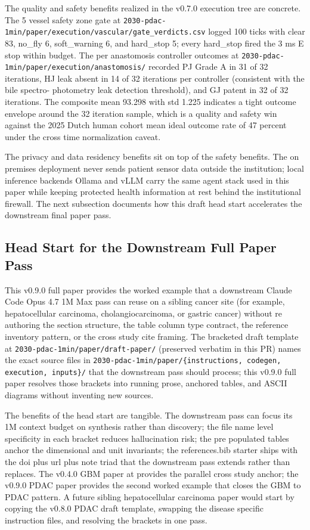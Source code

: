 The quality and safety benefits realized in the v0.7.0 execution
tree are concrete. The 5 vessel safety zone gate at
\texttt{2030-pdac-1min/paper/execution/vascular/gate_verdicts.csv}
logged 100 ticks with clear 83, no_fly 6, soft_warning 6, and
hard_stop 5; every hard_stop fired the 3 ms E stop within budget.
The per anastomosis controller outcomes at
\texttt{2030-pdac-1min/paper/execution/anastomosis/} recorded PJ
Grade A in 31 of 32 iterations, HJ leak absent in 14 of 32
iterations per controller (consistent with the bile spectro-
photometry leak detection threshold), and GJ patent in 32 of 32
iterations. The composite mean 93.298 with std 1.225 indicates a
tight outcome envelope around the 32 iteration sample, which is a
quality and safety win against the 2025 Dutch human cohort mean
ideal outcome rate of 47 percent \cite{DutchCohort2025Whipple}
under the cross time normalization caveat.

The privacy and data residency benefits sit on top of the safety
benefits. The on premises deployment never sends patient sensor
data outside the institution; local inference backends Ollama
\cite{ollama} and vLLM \cite{vllm} carry the same agent stack
used in this paper while keeping protected health information at
rest behind the institutional firewall. The next subsection
documents how this draft head start accelerates the downstream
final paper pass.

\subsection{Head Start for the Downstream Full Paper Pass}
\label{sec:discussion-headstart}

This v0.9.0 full paper provides the worked example that a
downstream Claude Code Opus 4.7 1M Max pass can reuse on a
sibling cancer site (for example, hepatocellular carcinoma,
cholangiocarcinoma, or gastric cancer) without re authoring the
section structure, the table column type contract, the reference
inventory pattern, or the cross study cite framing. The bracketed
draft template at
\texttt{2030-pdac-1min/paper/draft-paper/} (preserved verbatim in
this PR) names the exact source files in
\texttt{2030-pdac-1min/paper/\{instructions, codegen, execution,
inputs\}/} that the downstream pass should process; this v0.9.0
full paper resolves those brackets into running prose, anchored
tables, and ASCII diagrams without inventing new sources.

The benefits of the head start are tangible. The downstream pass
can focus its 1M context budget on synthesis rather than
discovery; the file name level specificity in each bracket
reduces hallucination risk; the pre populated tables anchor the
dimensional and unit invariants; the references.bib starter ships
with the doi plus url plus note triad that the downstream pass
extends rather than replaces. The v0.4.0 GBM paper at
\cite{kawchak_2026_20113157} provides the parallel cross study
anchor; the v0.9.0 PDAC paper provides the second worked example
that closes the GBM to PDAC pattern. A future sibling
hepatocellular carcinoma paper would start by copying the v0.8.0
PDAC draft template, swapping the disease specific instruction
files, and resolving the brackets in one pass.


